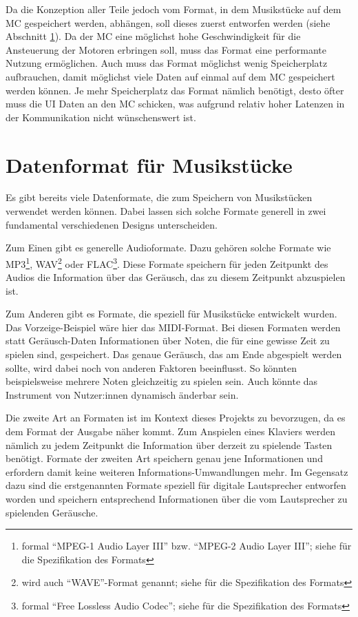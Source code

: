 Da die Konzeption aller Teile jedoch vom Format, in dem Musikstücke auf dem \ac{MC} gespeichert werden, abhängen, soll dieses zuerst entworfen werden (siehe Abschnitt \ref{vorgehenSW-PIDI}).
Da der \ac{MC} eine möglichst hohe Geschwindigkeit für die Ansteuerung der Motoren erbringen soll, muss das Format eine performante Nutzung ermöglichen.
Auch muss das Format möglichst wenig Speicherplatz aufbrauchen, damit möglichst viele Daten auf einmal auf dem \ac{MC} gespeichert werden können.
Je mehr Speicherplatz das Format nämlich benötigt, desto öfter muss die \ac{UI} Daten an den \ac{MC} schicken, was aufgrund relativ hoher Latenzen in der Kommunikation nicht wünschenswert ist.


\section{Datenformat für Musikstücke} \label{vorgehenSW-PIDI}

Es gibt bereits viele Datenformate, die zum Speichern von Musikstücken verwendet werden können. Dabei lassen sich solche Formate generell in zwei fundamental verschiedenen Designs unterscheiden.

Zum Einen gibt es generelle Audioformate. Dazu gehören solche Formate wie MP3\footnote{formal \enquote{MPEG-1 Audio Layer III} bzw. \enquote{MPEG-2 Audio Layer III}; siehe \cite{iso.MP3} für die Spezifikation des Formats}, WAV\footnote{wird auch \enquote{WAVE}-Format genannt; siehe \cite{kab.WaveFileSpecifications.22} für die Spezifikation des Formats} oder FLAC\footnote{formal \enquote{Free Lossless Audio Codec}; siehe \cite{bw.FLAC.24} für die Spezifikation des Formats}.
Diese Formate speichern für jeden Zeitpunkt des Audios die Information über das Geräusch, das zu diesem Zeitpunkt abzuspielen ist.

Zum Anderen gibt es Formate, die speziell für Musikstücke entwickelt wurden.
Das Vorzeige-Beispiel wäre hier das \ac{MIDI}-Format.
Bei diesen Formaten werden statt Geräusch-Daten Informationen über Noten, die für eine gewisse Zeit zu spielen sind, gespeichert.
Das genaue Geräusch, das am Ende abgespielt werden sollte, wird dabei noch von anderen Faktoren beeinflusst.
So könnten beispielsweise mehrere Noten gleichzeitig zu spielen sein.
Auch könnte das Instrument von Nutzer:innen dynamisch änderbar sein.

Die zweite Art an Formaten ist im Kontext dieses Projekts zu bevorzugen, da es dem Format der Ausgabe näher kommt.
Zum Anspielen eines Klaviers werden nämlich zu jedem Zeitpunkt die Information über derzeit zu spielende Tasten benötigt.
Formate der zweiten Art speichern genau jene Informationen und erfordern damit keine weiteren Informations-Umwandlungen mehr. \newline
Im Gegensatz dazu sind die erstgenannten Formate speziell für digitale Lautsprecher entworfen worden und speichern entsprechend Informationen über die vom Lautsprecher zu spielenden Geräusche.

